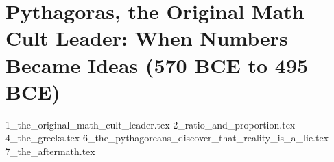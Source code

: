 \section{Pythagoras, the Original Math Cult Leader: When Numbers Became Ideas (570 BCE to 495 BCE)}

{1_the_original_math_cult_leader.tex}
{2_ratio_and_proportion.tex}
{4_the_greeks.tex}
{6_the_pythagoreans_discover_that_reality_is_a_lie.tex}
{7_the_aftermath.tex}